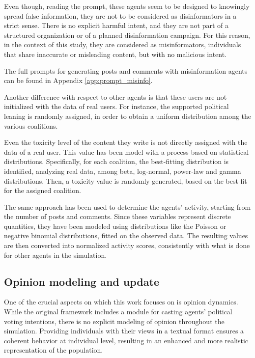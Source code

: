 Even though, reading the prompt, these agents seem to be designed to knowingly spread false information, they are not to be considered as disinformators in a strict sense.
There is no explicit harmful intent, and they are not part of a structured organization or of a planned disinformation campaign.
For this reason, in the context of this study, they are considered as misinformators, individuals that share inaccurate or misleading content, but with no malicious intent.

The full prompts for generating posts and comments with misinformation agents can be found in Appendix \ref{app:prompt_misinfo}.

\medskip
Another difference with respect to other agents is that these users are not initialized with the data of real users.
For instance, the supported political leaning is randomly assigned, in order to obtain a uniform distribution among the various coalitions.

Even the toxicity level of the content they write is not directly assigned with the data of a real user.
This value has been model with a process based on statistical distributions.
Specifically, for each coalition, the best-fitting distribution is identified, analyzing real data, among beta, log-normal, power-law and gamma distributions.
Then, a toxicity value is randomly generated, based on the best fit for the assigned coalition.

The same approach has been used to determine the agents' activity, starting from the number of posts and comments.
Since these variables represent discrete quantities, they have been modeled using distributions like the Poisson or negative binomial distributions, fitted on the observed data.
The resulting values are then converted into normalized activity scores, consistently with what is done for other agents in the simulation.


\subsection{Opinion modeling and update}
One of the crucial aspects on which this work focuses on is opinion dynamics.
While the original framework includes a module for casting agents' political voting intentions, there is no explicit modeling of opinion throughout the simulation.
Providing individuals with their views in a textual format ensures a coherent behavior at individual level, resulting in an enhanced and more realistic representation of the population.


